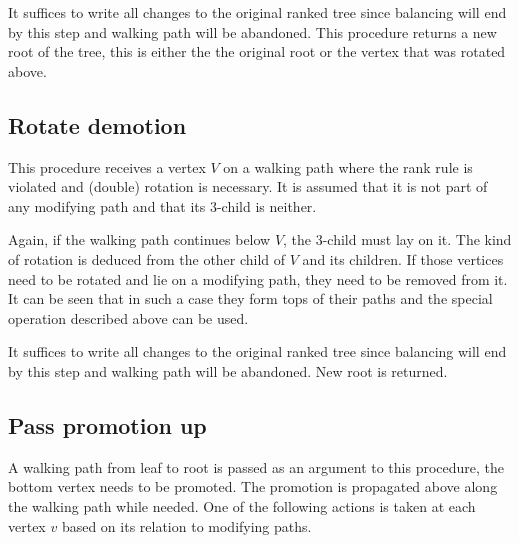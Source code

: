 It suffices to write all changes to the original ranked tree since balancing will end by this step and walking path will be abandoned. 
This procedure returns a new root of the tree, this is either the the original root or the vertex that was rotated above.

\subsection{Rotate demotion}

This procedure receives a vertex $V$ on a walking path where the rank rule is violated and (double) rotation is necessary. It is assumed that it is not part of any modifying path and that its $3$-child is neither. 

Again, if the walking path continues below $V$, the 3-child must lay on it. The kind of rotation is deduced from the other child of $V$ and its children. If those vertices need to be rotated and lie on a modifying path, they need to be removed from it. It can be seen that in such a case they form tops of their paths and the special operation described above can be used.

It suffices to write all changes to the original ranked tree since balancing will end by this step and walking path will be abandoned. New root is returned.

\subsection{Pass promotion up}

A walking path from leaf to root is passed as an argument to this procedure, the bottom vertex needs to be promoted. The promotion is propagated above along the walking path while needed. One of the following actions is taken at each vertex $v$ based on its relation to modifying paths.

